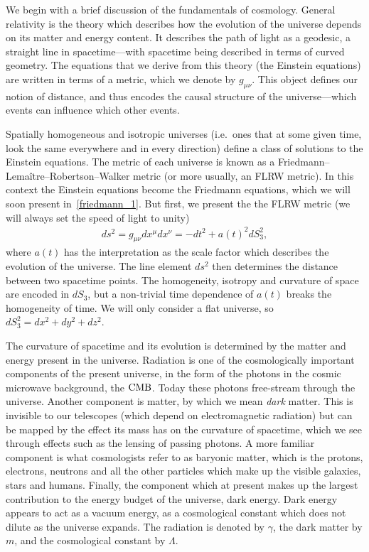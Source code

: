     We begin with a brief discussion of the fundamentals of cosmology.
    General relativity is the theory which describes how the evolution of the universe depends
    on its matter and energy content. It describes the path of light as a geodesic, a straight line
    in spacetime---with spacetime being described in terms of curved geometry.
    The equations that we derive from this theory (the Einstein equations) are written in terms of a metric,
    which we denote by $g_{\mu\nu}$. This object defines our notion of distance, and thus encodes
    the causal structure of the universe---which events can influence which other events.
    

    Spatially homogeneous and isotropic universes (i.e.\ ones that at some given
    time, look the same everywhere and in every direction)
    define a class of solutions to the Einstein equations.
    The metric of each universe is known as a Friedmann–Lemaître–Robertson–Walker metric
    (or more usually, an FLRW metric). In this context
    the Einstein equations become the Friedmann equations, which we will soon present
    in~\eqref{friedmann_1}.
    But first, we present the the FLRW metric (we will always set the speed of light to unity)
    \begin{align}\label{flrw_metric}
        ds^2 = g_{\mu\nu}dx^{\mu}dx^{\nu} = - dt^2 + a(t)^2 dS_3^2,
    \end{align}
    where $a(t)$ has the interpretation as the scale factor
    which describes the evolution of the universe.
    The line element $ds^2$ then determines the distance between two spacetime points.
    The homogeneity, isotropy and curvature of space are encoded in $dS_3$,
    but a non-trivial time dependence of $a(t)$ breaks the homogeneity of time.
    We will only consider a flat universe, so $dS_3^2=dx^2+dy^2+dz^2$.


    The curvature of spacetime and its evolution is determined by the matter and energy
    present in the universe.
    Radiation is one of the cosmologically important components of the present universe, in the form of the
    photons in the cosmic microwave background, the $\text{CMB}$.
    Today these photons free-stream through the universe.
    Another component is matter, by which we mean \textit{dark} matter.
    This is invisible to our telescopes (which depend on electromagnetic radiation) but can be mapped by the
    effect its mass has on the curvature of spacetime, which we see through
    effects such as the lensing of passing photons.
    A more familiar component is what cosmologists refer to as baryonic matter, which is
    the protons, electrons, neutrons and all the other particles which make up the visible galaxies, stars
    and humans.
    Finally, the component which at present makes up the largest contribution to the
    energy budget of the universe, dark energy.
    Dark energy appears to act as a vacuum energy, as a cosmological constant which does not
    dilute as the universe expands. The radiation is denoted by $\gamma$,
    the dark matter by $m$, and the cosmological constant by $\Lambda$.


